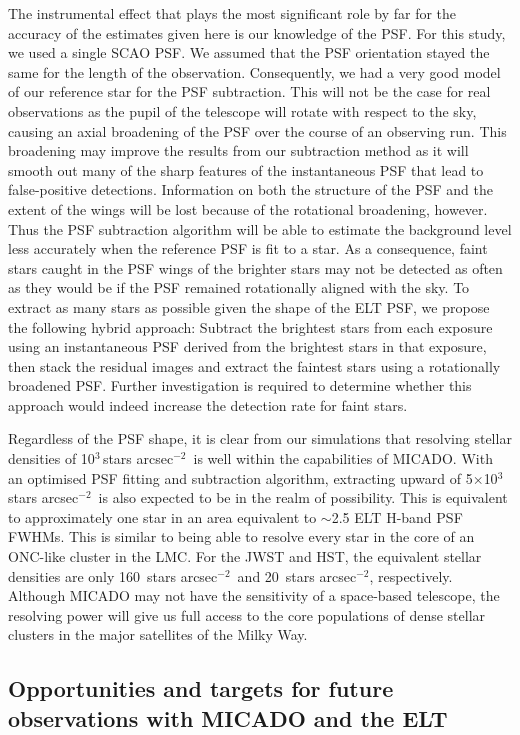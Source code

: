 \documentclass{aa}
\newcommand{\s}{$\sim$}
\newcommand{\h}[1]{$^{#1}$}
\newcommand{\spa}{stars arcsec$^{-2}$~}
\newcommand{\spae}{stars arcsec$^{-2}$}
\begin{document}
The instrumental effect that plays the most significant role by far for the accuracy of the estimates given here is our knowledge of the PSF\@.
For this study, we used a single SCAO PSF\@.
We assumed that the PSF orientation stayed the same for the length of the observation.
Consequently, we had a very good model of our reference star for the PSF subtraction.
This will not be the case for real observations as the pupil of the telescope will rotate with respect to the sky, causing an axial broadening of the PSF over the course of an observing run.
This broadening may improve the results from our subtraction method as it will smooth out many of the sharp features of the instantaneous PSF that lead to false-positive detections.
Information on both the structure of the PSF and the extent of the wings will be lost because of the rotational broadening, however.
Thus the PSF subtraction algorithm will be able to estimate the background level less accurately when the reference PSF is fit to a star.
As a consequence, faint stars caught in the PSF wings of the brighter stars may not be detected as often as they would be if the PSF remained rotationally aligned with the sky.
To extract as many stars as possible given the shape of the ELT PSF, we propose the following hybrid approach: Subtract the brightest stars from each exposure using an instantaneous PSF derived from the brightest stars in that exposure, then stack the residual images and extract the faintest stars using a rotationally broadened PSF\@.
Further investigation is required to determine whether this approach would indeed increase the detection rate for faint stars.

Regardless of the PSF shape, it is clear from our simulations that resolving stellar densities of 10\h3\,\spa is well within the capabilities of MICADO\@.
With an optimised PSF fitting and subtraction algorithm, extracting upward of 5$\times$10\h3\,\spa is also expected to be in the realm of possibility.
This is equivalent to approximately one star in an area equivalent to \s2.5 ELT H-band PSF FWHMs.
This is similar to being able to resolve every star in the core of an ONC-like cluster in the LMC\@.
For the JWST and HST, the equivalent stellar densities are only 160~\spa and 20~\spae, respectively.
Although MICADO may not have the sensitivity of a space-based telescope, the resolving power will give us full access to the core populations of dense stellar clusters in the major satellites of the Milky Way.


\subsection{Opportunities and targets for future observations with MICADO and the ELT}
  \label{subsec:future_opportunities}
\end{document}
